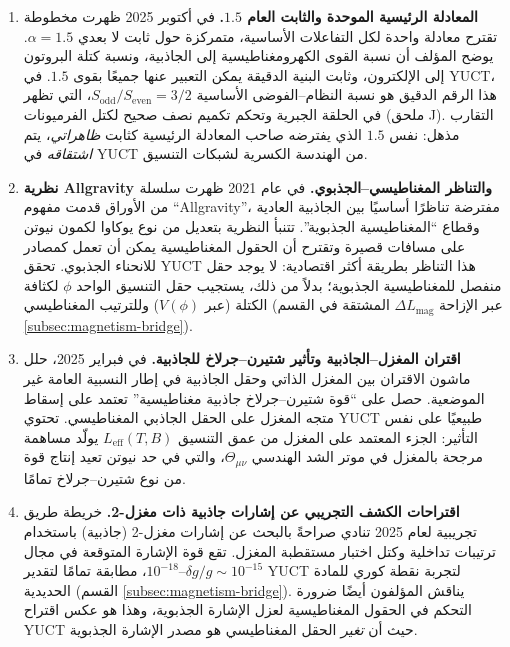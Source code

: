 \documentclass[11pt,a4paper]{article}
\begin{document}
	\begin{enumerate}
		
		\item \textbf{المعادلة الرئيسية الموحدة والثابت العام $1.5$.} في أكتوبر 2025 ظهرت مخطوطة \cite{UnifiedMaster2025} تقترح معادلة واحدة لكل التفاعلات الأساسية، متمركزة حول ثابت لا بعدي $\alpha = 1.5$. يوضح المؤلف أن نسبة القوى الكهرومغناطيسية إلى الجاذبية، ونسبة كتلة البروتون إلى الإلكترون، وثابت البنية الدقيقة يمكن التعبير عنها جميعًا بقوى $1.5$. في YUCT، هذا الرقم الدقيق هو نسبة النظام–الفوضى الأساسية $S_{\mathrm{odd}}/S_{\mathrm{even}} = 3/2$، التي تظهر في الحلقة الجبرية وتحكم تكميم نصف صحيح لكتل الفرميونات (ملحق J). التقارب مذهل: نفس $1.5$ الذي يفترضه صاحب المعادلة الرئيسية كثابت \emph{ظاهراتي}، يتم \emph{اشتقاقه} في YUCT من الهندسة الكسرية لشبكات التنسيق.
		
		\item \textbf{نظرية Allgravity والتناظر المغناطيسي–الجذبوي.} في عام 2021 ظهرت سلسلة من الأوراق \cite{Allgravity2021} قدمت مفهوم ``Allgravity''، مفترضة تناظرًا أساسيًا بين الجاذبية العادية وقطاع ``المغناطيسية الجذبوية''. تتنبأ النظرية بتعديل من نوع يوكاوا لكمون نيوتن على مسافات قصيرة وتقترح أن الحقول المغناطيسية يمكن أن تعمل كمصادر للانحناء الجذبوي. تحقق YUCT هذا التناظر بطريقة أكثر اقتصادية: لا يوجد حقل منفصل للمغناطيسية الجذبوية؛ بدلاً من ذلك، يستجيب حقل التنسيق الواحد $\phi$ لكثافة الكتلة (عبر $V(\phi)$) وللترتيب المغناطيسي (عبر الإزاحة $\Delta L_{\mathrm{mag}}$ المشتقة في القسم \ref{subsec:magnetism-bridge}).
		
		\item \textbf{اقتران المغزل–الجاذبية وتأثير شتيرن–جرلاخ للجاذبية.} في فبراير 2025، حلل ماشون \cite{Mashhoon2025} الاقتران بين المغزل الذاتي وحقل الجاذبية في إطار النسبية العامة غير الموضعية. حصل على ``قوة شتيرن–جرلاخ جاذبية مغناطيسية'' تعتمد على إسقاط متجه المغزل على الحقل الجاذبي المغناطيسي. تحتوي YUCT طبيعيًا على نفس التأثير: الجزء المعتمد على المغزل من عمق التنسيق $L_{\mathrm{eff}}(T,B)$ يولّد مساهمة مرجحة بالمغزل في موتر الشد الهندسي $\Theta_{\mu\nu}$، والتي في حد نيوتن تعيد إنتاج قوة من نوع شتيرن–جرلاخ تمامًا.
		
		\item \textbf{اقتراحات الكشف التجريبي عن إشارات جاذبية ذات مغزل-2.} خريطة طريق تجريبية لعام 2025 \cite{Spin2Proposal2025} تنادي صراحةً بالبحث عن إشارات مغزل-2 (جاذبية) باستخدام ترتيبات تداخلية وكتل اختبار مستقطبة المغزل. تقع قوة الإشارة المتوقعة في مجال $\delta g / g \sim 10^{-15}$–$10^{-18}$، مطابقة تمامًا لتقدير YUCT لتجربة نقطة كوري للمادة الحديدية (القسم \ref{subsec:magnetism-bridge}). يناقش المؤلفون أيضًا ضرورة التحكم في الحقول المغناطيسية لعزل الإشارة الجذبوية، وهذا هو عكس اقتراح YUCT حيث أن \emph{تغير} الحقل المغناطيسي هو مصدر الإشارة الجذبوية.
		

\end{enumerate}
\end{document}
